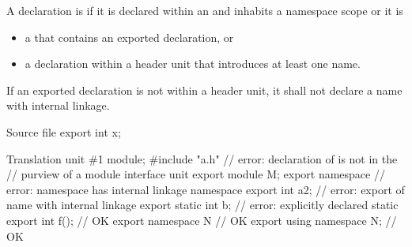 \pnum
A declaration is  if it is
declared within an  and
inhabits a namespace scope or it is
\begin{itemize}
\item a  that contains an
      exported declaration, or
\item a declaration within a header unit
      that introduces at least one name.
\end{itemize}

\pnum
If an exported declaration is not within a header unit,
it shall not declare a name with internal linkage.

\pnum
\begin{example}
\begin{codeblocktu}{Source file }
export int x;
\end{codeblocktu}

\begin{codeblocktu}{Translation unit \#1}
module;
#include "a.h"                  // error: declaration of  is not in the
                                // purview of a module interface unit
export module M;
export namespace {}             // error: namespace has internal linkage
namespace {
  export int a2;                // error: export of name with internal linkage
}
export static int b;            // error:  explicitly declared static
export int f();                 // OK
export namespace N { }          // OK
export using namespace N;       // OK
\end{codeblocktu}
\end{example}

